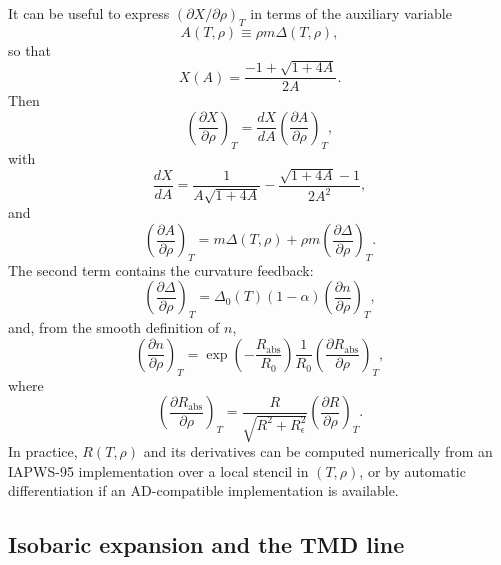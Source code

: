 \documentclass[12pt]{article}
\begin{document}
It can be useful to express $(\partial X/\partial\rho)_T$ in terms of the auxiliary variable
\begin{equation}
  A(T,\rho)\equiv\rho m\Delta(T,\rho),
\end{equation}
so that
\begin{equation}
  X(A)=\frac{-1+\sqrt{1+4A}}{2A}.
\end{equation}
Then
\begin{equation}
  \left(\frac{\partial X}{\partial\rho}\right)_T=\frac{dX}{dA}\left(\frac{\partial A}{\partial\rho}\right)_T,
\end{equation}
with
\begin{equation}
  \frac{dX}{dA}=\frac{1}{A\sqrt{1+4A}}-\frac{\sqrt{1+4A}-1}{2A^2},
\end{equation}
and
\begin{equation}
  \left(\frac{\partial A}{\partial\rho}\right)_T=m\Delta(T,\rho)+\rho m\left(\frac{\partial\Delta}{\partial\rho}\right)_T.
\end{equation}
The second term contains the curvature feedback:
\begin{equation}
  \left(\frac{\partial\Delta}{\partial\rho}\right)_T=\Delta_0(T)(1-\alpha)\left(\frac{\partial n}{\partial\rho}\right)_T,
\end{equation}
and, from the smooth definition of $n$,
\begin{equation}
  \left(\frac{\partial n}{\partial\rho}\right)_T=\exp\left(-\frac{R_{\mathrm{abs}}}{R_0}\right)\frac{1}{R_0}\left(\frac{\partial R_{\mathrm{abs}}}{\partial\rho}\right)_T,
\end{equation}
where
\begin{equation}
  \left(\frac{\partial R_{\mathrm{abs}}}{\partial\rho}\right)_T=\frac{R}{\sqrt{R^2+R_\epsilon^2}}\left(\frac{\partial R}{\partial\rho}\right)_T.
\end{equation}
In practice, $R(T,\rho)$ and its derivatives can be computed numerically from an IAPWS-95 implementation over a local stencil in $(T,\rho)$, or by automatic differentiation if an AD-compatible implementation is available.

\subsection{Isobaric expansion and the TMD line}
\end{document}

